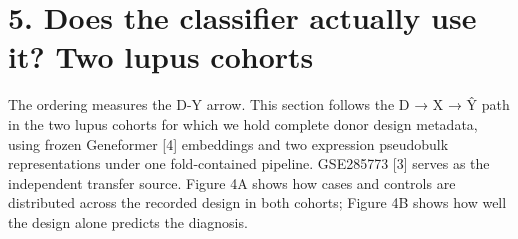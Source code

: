 \section{5. Does the classifier actually use it? Two lupus cohorts}\label{does-the-classifier-actually-use-it-two-lupus-cohorts}

The ordering measures the D-Y arrow. This section follows the D → X → Ŷ path in the two lupus cohorts for which we hold complete donor design metadata, using frozen Geneformer {[}4{]} embeddings and two expression pseudobulk representations under one fold-contained pipeline. GSE285773 {[}3{]} serves as the independent transfer source. Figure 4A shows how cases and controls are distributed across the recorded design in both cohorts; Figure 4B shows how well the design alone predicts the diagnosis.
